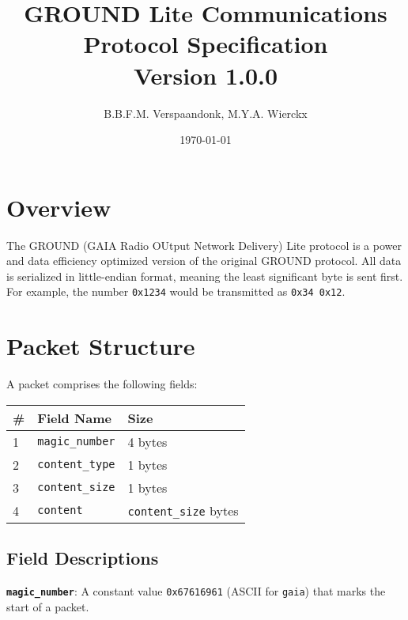\documentclass[a4paper]{article}
\title{GROUND Lite Communications Protocol Specification\\ \large Version 1.0.0}
\date{\today}
\author{B.B.F.M. Verspaandonk, M.Y.A. Wierckx}
\begin{document}
\maketitle

\tableofcontents

\section{Overview}
The GROUND (GAIA Radio OUtput Network Delivery) Lite protocol is a power and data efficiency optimized version of the original GROUND protocol. All data is serialized in little-endian format, meaning the least significant byte is sent first. For example, the number \texttt{0x1234} would be transmitted as \texttt{0x34 0x12}.

\section{Packet Structure}
A packet comprises the following fields:
\begin{longtable}{@{}lll@{}}
\toprule
\# & Field Name             & Size                         \\
\midrule
1  & \texttt{magic\_number} & 4 bytes                      \\
2  & \texttt{content\_type} & 1 bytes                      \\
3  & \texttt{content\_size} & 1 bytes                      \\
4  & \texttt{content}       & \texttt{content\_size} bytes \\
\bottomrule
\end{longtable}

\subsection{Field Descriptions}
\textbf{\texttt{magic\_number}}: A constant value \texttt{0x67616961} (ASCII for \texttt{gaia}) that marks the start of a packet.
\end{document}
